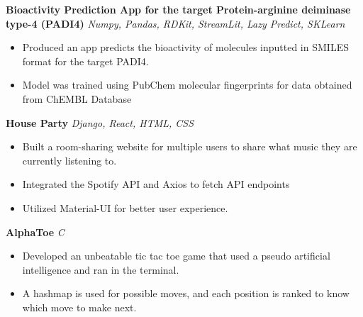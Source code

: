 \documentclass[a4paper]{article}
\begin{document}
{\textbf{Bioactivity Prediction App for the target Protein-arginine deiminase type-4 (PADI4)}} {\sl Numpy, Pandas, RDKit, StreamLit, Lazy Predict, SKLearn} \\
\vspace{-1mm}
\begin{itemize} \itemsep 1pt
	\item Produced an app predicts the bioactivity of molecules inputted in SMILES format for the target PADI4.
	\item Model was trained using PubChem molecular fingerprints for data obtained from ChEMBL Database
\end{itemize}
\vspace*{1mm}

{\textbf{House Party}} {\sl Django, React, HTML, CSS} \\
\vspace{-1mm}
\begin{itemize} \itemsep 1pt
	\item Built a room-sharing website for multiple users to share what music they are currently listening to.
	\item Integrated the Spotify API and Axios to fetch API endpoints
        \item Utilized Material-UI for better user experience.\\
\end{itemize}
\vspace*{1mm}

{\textbf{AlphaToe}} {\sl C}\\
\vspace{-1mm}
\begin{itemize} \itemsep 1pt
	\item Developed an unbeatable tic tac toe game that used a pseudo artificial intelligence and ran in the terminal.
	\item A hashmap is used for possible moves, and each position is ranked to know which move to make next.\\
\end{itemize}
\vspace*{1mm}
\end{document}
